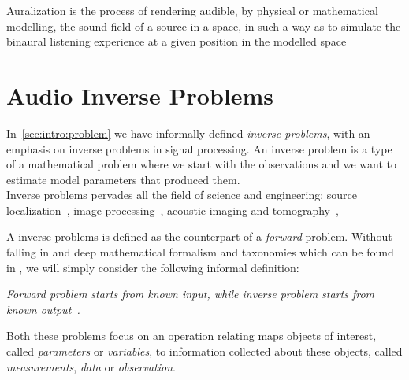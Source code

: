 Auralization is the process of rendering audible, by physical or mathematical modelling, the sound field
of a source in a space, in such a way as to simulate the binaural listening experience at a given position in the modelled space

\section{Audio Inverse Problems}\label{sec:processing:inverse}
\cite{kitic2015cosparse}
In~\cref{sec:intro:problem} we have informally defined \textit{inverse problems}, with an emphasis on inverse problems in signal processing.
An inverse problem is a type of a mathematical problem where we start with the observations and we want to estimate model parameters that produced them.
\\Inverse problems pervades all the field of science and engineering:
source localization~\cite{},
image processing~\cite{},
acoustic imaging and tomography~\cite{},

A inverse problems is defined as the counterpart of a \textit{forward} problem.
Without falling in and deep mathematical formalism and taxonomies which can be found in ,
we will simply consider the following informal definition:
\begin{center}
    \textit{\emph{Forward problem} starts from known input, while \emph{inverse problem} starts from known output~\cite{santamarina2005discrete}.}
\end{center}
Both these problems focus on an operation relating maps objects of interest, called \textit{parameters} or \textit{variables},
to information collected about these objects, called \textit{measurements}, \textit{data} or \textit{observation}.

